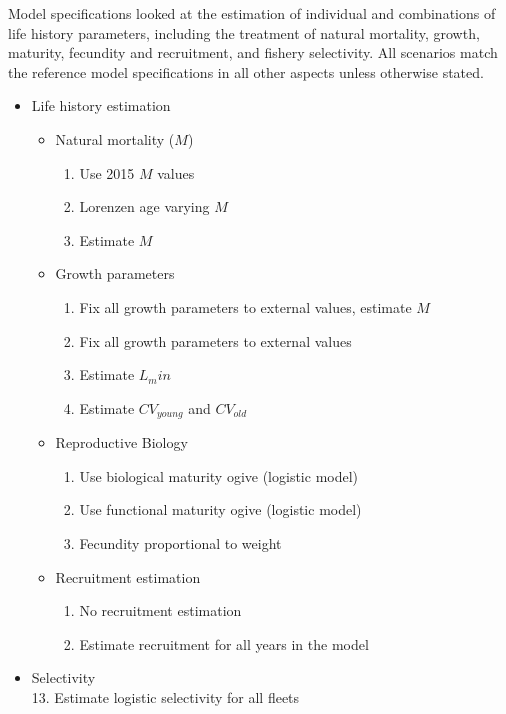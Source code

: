 \documentclass[11pt,
  english,
  letterpaper,
]{article}
\providecommand{\tightlist}{%
  \setlength{\itemsep}{0pt}\setlength{\parskip}{0pt}}
\providecommand{\tightlist}{%
  \setlength{\itemsep}{0pt}\setlength{\parskip}{0pt}}
\begin{document}
Model specifications looked at the estimation of individual and combinations of life history parameters, including the treatment of natural mortality, growth, maturity, fecundity and recruitment, and fishery selectivity. All scenarios match the reference model specifications in all other aspects unless otherwise stated.

\begin{itemize}
\item
  Life history estimation

  \begin{itemize}
  \tightlist
  \item
    Natural mortality (\(M\))

    \begin{enumerate}
    \def\labelenumi{\arabic{enumi}.}
    \tightlist
    \item
      Use 2015 \(M\) values
    \item
      Lorenzen age varying \(M\)
    \item
      Estimate \(M\)
    \end{enumerate}
  \item
    Growth parameters

    \begin{enumerate}
    \def\labelenumi{\arabic{enumi}.}
    \setcounter{enumi}{3}
    \tightlist
    \item
      Fix all growth parameters to external values, estimate \(M\)
    \item
      Fix all growth parameters to external values
    \item
      Estimate \(L_min\)
    \item
      Estimate \(CV_{young}\) and \(CV_{old}\)
    \end{enumerate}
  \item
    Reproductive Biology

    \begin{enumerate}
    \def\labelenumi{\arabic{enumi}.}
    \setcounter{enumi}{7}
    \tightlist
    \item
      Use biological maturity ogive (logistic model)
    \item
      Use functional maturity ogive (logistic model)
    \item
      Fecundity proportional to weight
    \end{enumerate}
  \item
    Recruitment estimation

    \begin{enumerate}
    \def\labelenumi{\arabic{enumi}.}
    \setcounter{enumi}{10}
    \tightlist
    \item
      No recruitment estimation
    \item
      Estimate recruitment for all years in the model
    \end{enumerate}
  \end{itemize}
\item
  Selectivity\\
  13. Estimate logistic selectivity for all fleets
\end{itemize}
\end{document}
